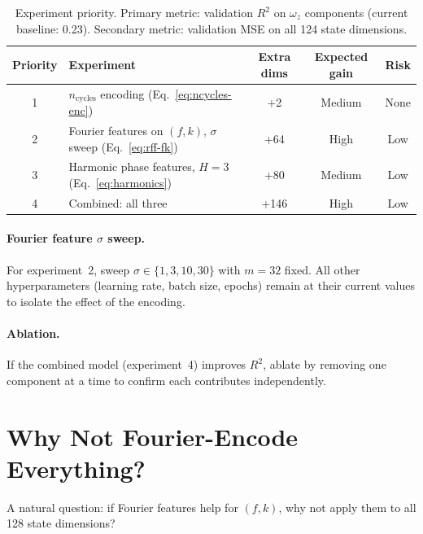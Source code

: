 \documentclass[11pt]{article}
\begin{document}
\begin{table}[H]
  \centering
  \renewcommand{\arraystretch}{1.3}
  \begin{tabular}{clccc}
    \toprule
    \textbf{Priority} & \textbf{Experiment} & \textbf{Extra dims} & \textbf{Expected gain} & \textbf{Risk} \\
    \midrule
    1 & $n_{\mathrm{cycles}}$ encoding (Eq.~\ref{eq:ncycles-enc})
      & +2  & Medium & None \\
    2 & Fourier features on $(f, k)$, $\sigma$ sweep (Eq.~\ref{eq:rff-fk})
      & +64 & High & Low \\
    3 & Harmonic phase features, $H = 3$ (Eq.~\ref{eq:harmonics})
      & +80 & Medium & Low \\
    4 & Combined: all three
      & +146 & High & Low \\
    \bottomrule
  \end{tabular}
  \caption{Experiment priority.
    Primary metric: validation $R^2$ on $\omega_z$ components
    (current baseline: 0.23).
    Secondary metric: validation MSE on all 124 state dimensions.}
  \label{tab:experiments}
\end{table}

\paragraph{Fourier feature $\sigma$ sweep.}
For experiment~2, sweep $\sigma \in \{1, 3, 10, 30\}$ with $m = 32$ fixed.
All other hyperparameters (learning rate, batch size, epochs) remain at their
current values to isolate the effect of the encoding.

\paragraph{Ablation.}
If the combined model (experiment~4) improves $R^2$, ablate by removing one
component at a time to confirm each contributes independently.

\section{Why Not Fourier-Encode Everything?}
\label{sec:why-not-all}

A natural question: if Fourier features help for $(f, k)$, why not apply them
to all 128 state dimensions?
\end{document}
